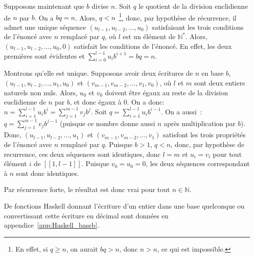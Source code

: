 Supposons maintenant que $b$ divise $n$. 
Soit $q$ le quotient de la division enclidienne de $n$ par $b$. 
On a $b q = n$.
Alors, $q < n$~\footnote{En effet, si $q \geq n$, on aurait $b q > n$, donc $n > n$, ce qui est impossible.}, donc, par hypothèse de récurrence, il admet une unique séquence $(u_{l-1}, u_{l-2}, \dots, u_0)$ satisfaisant les trois conditions de l'énoncé avec $n$ remplacé par $q$, où $l$ est un élément de $\mathbb{N}^*$. 
Alors, $(u_{l-1}, u_{l-2}, \dots, u_0, 0)$ satisfait les conditions de l'énoncé. 
En effet, les deux premières sont évidentes et $\sum_{i=0}^{l-1} u_i b^{i+1} = b q = n$. 

Montrons qu'elle est unique. 
Supposons avoir deux écritures de $n$ en base $b$, $(u_{l-1}, u_{l-2}, \dots, u_1, u_0)$ et $(v_{m-1}, v_{m-2}, \dots, v_1, v_0)$, où $l$ et $m$ sont deux entiers naturels non nuls. 
Alors, $u_0$ et $v_0$ doivent être égaux au reste de la division euclidienne de $n$ par $b$, et donc égaux à $0$. 
On a donc: $n = \sum_{i=1}^{l-1} u_i b^{i} = \sum_{j=1}^{m-1} v_j b^{j}$. 
Soit $q = \sum_{i=1}^{l-1} u_i b^{i-1}$. 
On a aussi : $q = \sum_{j=1}^{m-1} v_j b^{j-1}$ (puisque ce nombre donne aussi $n$ après multiplication par $b$).  
Donc, $(u_{l-1}, u_{l-2}, \dots, u_1)$ et $(v_{m-1}, v_{m-2}, \dots, v_1)$ satisfont les trois propriétés de l'énoncé avec $n$ remplacé par $q$. 
Puisque $b > 1$, $q < n$, donc, par hypothèse de recurrence, ces deux séquences sont identiques, donc $l = m$ et $u_i = v_i$ pour tout élément $i$ de $[\![1, l-1]\!]$. 
Puisque $v_0 = u_0 = 0$, les deux séquences correspondant à $n$ sont donc identiques. 

Par récurrence forte, le résultat est donc vrai pour tout $n \in \mathbb{N}$.

\done

\bigskip

De fonctions Haskell donnant l'écriture d'un entier dans une base quelconque ou convertissant cette écriture en décimal sont données en appendice~\ref{app:Haskell_baseb}.


